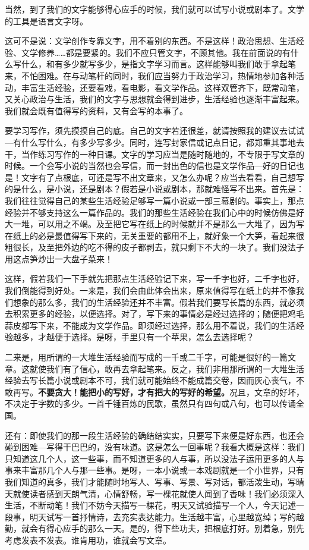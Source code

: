 \documentclass[12pt,a5paper]{ctexbook}
\begin{document}
当然，到了我们的文字能够得心应手的时候，我们就可以试写小说或剧本了。文学的工具是语言文字呀。

这可不是说：文学创作专靠文字，用不着别的东西。不是这样！政治思想、生活经验、文学修养……都是要紧的。我们不应只管文字，不顾其他。我在前面说的有什么写什么，和有多少就写多少，是指文字学习而言。这样能够叫我们敢于拿起笔来，不怕困难。在与动笔杆的同时，我们应当努力于政治学习，热情地参加各种活动，丰富生活经验，还要看戏，看电影，看文学作品。这样双管齐下，既常动笔，又关心政治与生活，我们的文字与思想就会得到进步，生活经验也逐渐丰富起来。我们就会既有值得写的资料，又有会写的本事了。

要学习写作，须先摸摸自己的底。自己的文字若还很差，就请按照我的建议去试试—有什么写什么，有多少写多少。同时，连写封家信或记点日记，都郑重其事地去干，当作练习写作的一种日课。文字的学习应当是随时随地的，不专限于写文章的时候。一个会写小说的当然也会写信，而一封出色的信也是文学作品—好的日记也是！文字有了点根底，可还是写不出文章来，又怎么办呢？应当去看看，自己想写的是什么，是小说，还是剧本？假若是小说或剧本，那就难怪写不出来。首先是：我们往往觉得自己的某些生活经验足够写一篇小说或一部三幕剧的。事实上，那点经验并不够支持这么一篇作品的。我们的那些生活经验在我们心中的时候仿佛是好大一堆，可以用之不竭。及至把它写在纸上的时候就并不是那么一大堆了，因为写在纸上的必是最值得写下来的，无关重要的都用不上，就好象一个大笋，看起来很粗很长，及至把外边的吃不得的皮子都剥去，就只剩下不大的一块了。我们没法子用这点笋炒出一大盘子菜来！

这样，假若我们一下手就先把那点生活经验记下来，写一千字也好，二千字也好，我们倒能得到好处。一来是，我们会由此体会出来，原来值得写在纸上的并不像我们想象的那么多，我们的生活经验还并不丰富。假若我们要写长篇的东西，就必须去积累更多的经验，以便选择。对了，写下来的事情必是经过选择的；随便把鸡毛蒜皮都写下来，不能成为文学作品。即须经过选择，那么用不着说，我们的生活经验越多，才越便于选择。是呀，手里只有一个苹果，怎么去选择呢？

二来是，用所谓的一大堆生活经验而写成的一千或二千字，可能是很好的一篇文章。这就使我们有了信心，敢再去拿起笔来。反之，我们非用那所谓的一大堆生活经验去写长篇小说或剧本不可，我们就可能始终不能成篇交卷，因而灰心丧气，不敢再写。\textbf{不要贪大！能把小的写好，才有把大的写好的希望。}况且，文章的好坏，不决定于字数的多少。一首千锤百炼的民歌，虽然只有四句或八句，也可以传诵全国。

还有：即使我们的那一段生活经验的确结结实实，只要写下来便是好东西，也还会碰到困难—写得干巴巴的，没有味道。这是怎么一回事呢？我看大概是这样：我们只知道这几个人，这一些事，而不知道更多的人与事，所以没法子运用更多的人与事来丰富那几个人与那一些事。是呀，一本小说或一本戏剧就是一个小世界，只有我们知道的真多，我们才能随时地写人、写事、写景、写对话，都活泼生动，写晴天就使读者感到天朗气清，心情舒畅，写一棵花就使人闻到了香味！我们必须深入生活，不断动笔！我们不妨今天描写一棵花，明天又试验描写一个人，今天记述一段事，明天试写一首抒情诗，去充实表达能力。生活越丰富，心里越宽绰；写的越勤，就会有得心应手的那么一天。是的，得下些功夫，把根底打好。别着急，别先考虑发表不发表。谁肯用功，谁就会写文章。
\end{document}

